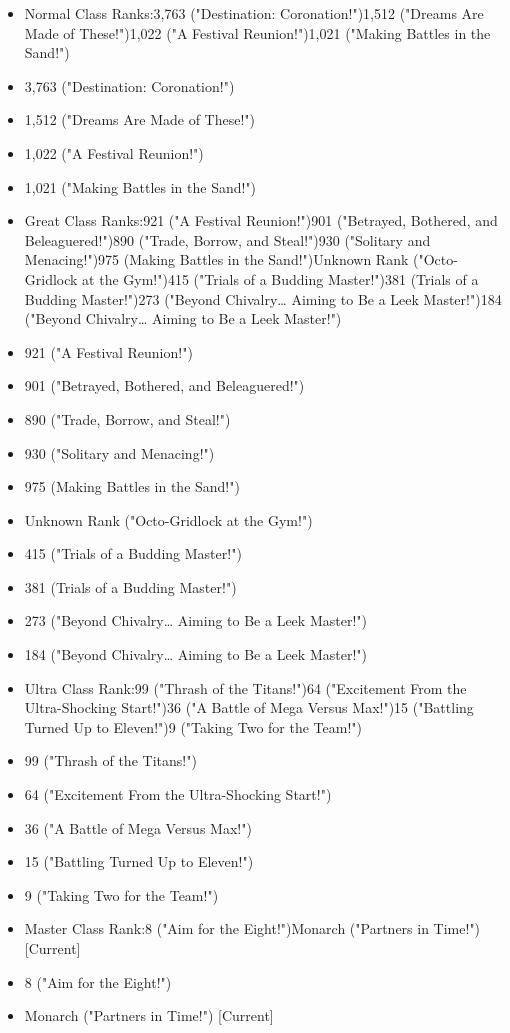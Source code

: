 \documentclass[a4paper,12pt]{article}
\begin{document}
\begin{itemize}
\item Normal Class Ranks:3,763 ("Destination: Coronation!")1,512 ("Dreams Are Made of These!")1,022 ("A Festival Reunion!")1,021 ("Making Battles in the Sand!")
\item 3,763 ("Destination: Coronation!")
\item 1,512 ("Dreams Are Made of These!")
\item 1,022 ("A Festival Reunion!")
\item 1,021 ("Making Battles in the Sand!")
\item Great Class Ranks:921 ("A Festival Reunion!")901 ("Betrayed, Bothered, and Beleaguered!")890 ("Trade, Borrow, and Steal!")930 ("Solitary and Menacing!")975 (Making Battles in the Sand!")Unknown Rank ("Octo-Gridlock at the Gym!")415 ("Trials of a Budding Master!")381 (Trials of a Budding Master!")273 ("Beyond Chivalry… Aiming to Be a Leek Master!")184 ("Beyond Chivalry… Aiming to Be a Leek Master!")
\item 921 ("A Festival Reunion!")
\item 901 ("Betrayed, Bothered, and Beleaguered!")
\item 890 ("Trade, Borrow, and Steal!")
\item 930 ("Solitary and Menacing!")
\item 975 (Making Battles in the Sand!")
\item Unknown Rank ("Octo-Gridlock at the Gym!")
\item 415 ("Trials of a Budding Master!")
\item 381 (Trials of a Budding Master!")
\item 273 ("Beyond Chivalry… Aiming to Be a Leek Master!")
\item 184 ("Beyond Chivalry… Aiming to Be a Leek Master!")
\item Ultra Class Rank:99 ("Thrash of the Titans!")64 ("Excitement From the Ultra-Shocking Start!")36 ("A Battle of Mega Versus Max!")15 ("Battling Turned Up to Eleven!")9 ("Taking Two for the Team!")
\item 99 ("Thrash of the Titans!")
\item 64 ("Excitement From the Ultra-Shocking Start!")
\item 36 ("A Battle of Mega Versus Max!")
\item 15 ("Battling Turned Up to Eleven!")
\item 9 ("Taking Two for the Team!")
\item Master Class Rank:8 ("Aim for the Eight!")Monarch ("Partners in Time!") [Current]
\item 8 ("Aim for the Eight!")
\item Monarch ("Partners in Time!") [Current]
\end{itemize}\\ \par \vspace{0.5cm}
\end{document}
